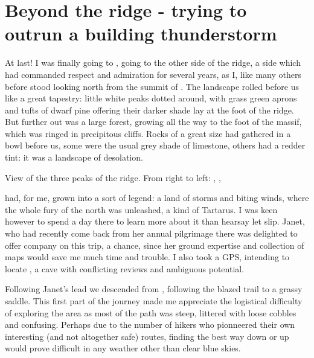 \section{Beyond the ridge - trying to outrun a building thunderstorm}
At last! I was finally going to , going to the other side of the ridge, a side which had commanded respect and admiration for several years, as I, like many others before stood looking north from the summit of . The landscape rolled before us like a great  tapestry: little white peaks dotted around, with grass green aprons and tufts of dwarf pine offering their darker shade lay at the foot of the ridge. But further out was a large forest, growing all the way to the foot of the  massif, which was ringed in precipitous cliffs. Rocks of a great size had gathered in a bowl before us, some were the usual grey shade of limestone, others had a redder tint: it was a landscape of desolation.

\begin{marginfigure}
    \checkoddpage \ifoddpage \forcerectofloat \else \forceversofloat \fi
    \centering
    \label{AreaNrob}
    \caption{View of the three peaks of the ridge. From right to left: \protect{}, \protect{}, \protect{} }
\end{marginfigure}

 had, for me, grown into a sort of legend: a land of storms and biting winds, where the whole fury of the north was unleashed, a kind of Tartarus. I was keen however to spend a day there to learn more about it than hearsay let slip. Janet, who had recently come back from her annual pilgrimage there was delighted to offer company on this trip, a chance, since her ground expertise and collection of maps would save me much time and trouble. I also took a GPS, intending to locate , a cave with conflicting reviews and ambiguous potential. 

Following Janet's lead we descended from , following the blazed trail to a grassy saddle. This first part of the journey made me appreciate the logistical difficulty of exploring the area as most of the path was steep, littered with loose cobbles and confusing. Perhaps due to the number of  hikers who pionneered their own interesting (and not altogether safe) routes, finding the best way down or up would prove difficult in any weather other than clear blue skies. 


